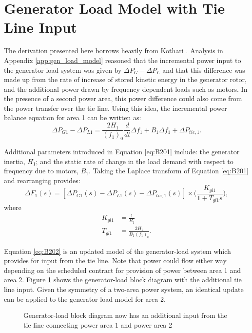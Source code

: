 \section{Generator Load Model with Tie Line Input}\label{app:generator_load_model_with_tie_line}
The derivation presented here borrows heavily from Kothari \cite{Kothari2011}. Analysis in Appendix \ref{app:gen_load_model} reasoned that the incremental power input to the generator load system was given by $\Delta P_G - \Delta P_L$ and that this difference was made up from the rate of increase of stored kinetic energy in the generator rotor, and the additional power drawn by frequency dependent loads such as motors. In the presence of a second power area, this power difference could also come from the power transfer over the tie line. Using this idea, the incremental power balance equation for area 1 can be written as:
\begin{equation}
	\Delta P_{G1} - \Delta P_{L1} = \frac{2 H_1}{(f_1)_0} \frac{d}{dt} \Delta f_1 + B_1 \Delta f_1 + \Delta P_{tie, 1}. \label{eq:B201}
\end{equation}

Additional parameters introduced in Equation \ref{eq:B201} include: the generator inertia, $H_1$; and the static rate of change in the load demand with respect to frequency due to motors, $B_1$. Taking the Laplace transform of Equation \ref{eq:B201} and rearranging provides:
\begin{equation}
	\Delta F_1(s) = [\Delta P_{G1}(s) - \Delta P_{L1}(s) - \Delta P_{tie,1}(s)] \times \bigg( \frac{K_{gl1}}{1 + T_{gl1}s} \bigg), \label{eq:B202}
\end{equation}
where
\begin{align}
	K_{gl1} &= \frac{1}{B_1} \\
	T_{gl1} &= \frac{2H_1}{B_1 (f_1)_0}.
\end{align}

Equation \ref{eq:B202} is an updated model of the generator-load system which provides for input from the tie line. Note that power could flow either way depending on the scheduled contract for provision of power between area 1 and area 2. Figure \ref{fig:B201_generator_load_model_1_with_tie_line} shows the generator-load block diagram with the additional tie line input. Given the symmetry of a two-area power system, an identical update can be applied to the generator load model for area 2.

\begin{figure}[h]
	\centering
	
	\caption[Generator-load model for a two or more area power system]{Generator-load block diagram now has an additional input from the tie line connecting power area 1 and power area 2}
	\label{fig:B201_generator_load_model_1_with_tie_line}
\end{figure}

